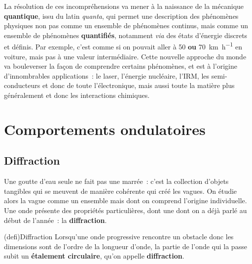 \documentclass[../../main/main.tex]{subfiles}
\begin{document}
La résolution de ces incompréhensions va mener à la naissance de la mécanique
\textbf{quantique}, issu du latin \textit{quanta}, qui permet une
description des phénomènes physiques non pas comme un ensemble de phénomènes
continus, mais comme un ensemble de phénomènes \textbf{quantifiés}, notamment
\textit{via} des états d'énergie discrets et définis. Par exemple, c'est comme
si on pouvait aller à 50 \textbf{ou} \SI{70}{km.h^{-1}} en voiture, mais pas à
une valeur intermédiaire.
\bigbreak
Cette nouvelle approche du monde va bouleverser la façon de comprendre certains
phénomènes, et est à l'origine d'innombrables applications~: le laser, l'énergie
nucléaire, l'IRM, les semi-conducteurs et donc de toute l'électronique, mais
aussi toute la matière plus généralement et donc les interactions chimiques.

\section{Comportements ondulatoires}
\label{sec:mqonde}
\subsection{Diffraction}
\label{ssec:ondediff}
Une goutte d'eau seule ne fait pas une marrée~: c'est la collection d'objets
tangibles qui se meuvent de manière cohérente qui créé les vagues. On étudie
alors la vague comme un ensemble mais dont on comprend l'origine individuelle.
Une onde présente des propriétés particulières, dont une dont on a déjà parlé au
début de l'année~: la \textbf{diffraction}.
\begin{tcb*}(defi){Diffraction}
	Lorsqu'une onde progressive rencontre un obstacle donc les dimensions sont de
	l'ordre de la longueur d'onde, la partie de l'onde qui la passe subit un
	\textbf{étalement circulaire}, qu'on appelle \textbf{diffraction}.
\end{tcb*}
\end{document}
